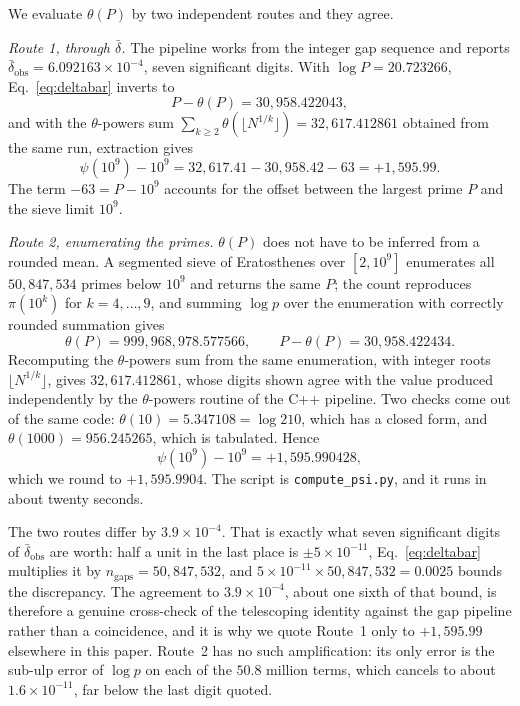 \documentclass[11pt]{article}
\begin{document}
We evaluate $\theta(P)$ by two independent routes and they agree.

\noindent\emph{Route 1, through $\bar\delta$.} The pipeline works from
the integer gap sequence and reports $\bar\delta_{\text{obs}} =
6.092163 \times 10^{-4}$, seven significant digits. With $\log P =
20.723266$, Eq.~\eqref{eq:deltabar} inverts to
\begin{equation}
P - \theta(P) = 30{,}958.422043 ,
\end{equation}
and with the $\theta$-powers sum
$\sum_{k \ge 2} \theta(\lfloor N^{1/k}\rfloor) = 32{,}617.412861$
obtained from the same run, extraction gives
\begin{equation}
\psi(10^9) - 10^9 = 32{,}617.41 - 30{,}958.42 - 63 = +1{,}595.99 .
\end{equation}
The term $-63 = P - 10^9$ accounts for the offset between the largest
prime $P$ and the sieve limit $10^9$.

\noindent\emph{Route 2, enumerating the primes.} $\theta(P)$ does not
have to be inferred from a rounded mean. A segmented sieve of
Eratosthenes over $[2, 10^9]$ enumerates all $50{,}847{,}534$ primes
below $10^9$ and returns the same $P$; the count reproduces
$\pi(10^k)$ for $k = 4,\dots,9$, and summing $\log p$ over the
enumeration with correctly rounded summation gives
\begin{equation}
\theta(P) = 999{,}968{,}978.577566, \qquad
P - \theta(P) = 30{,}958.422434 .
\label{eq:thetadirect}
\end{equation}
Recomputing the $\theta$-powers sum from the same enumeration, with
integer roots $\lfloor N^{1/k}\rfloor$, gives $32{,}617.412861$, whose
digits shown agree with the value produced independently by the
$\theta$-powers routine of the C++ pipeline. Two checks come out of the
same code: $\theta(10) = 5.347108 = \log 210$, which has a closed form,
and $\theta(1000) = 956.245265$, which is tabulated. Hence
\begin{equation}
\psi(10^9) - 10^9 = +1{,}595.990428 ,
\label{eq:psidirect}
\end{equation}
which we round to $+1{,}595.9904$. The script is
\texttt{compute\_psi.py}, and it runs in about twenty seconds.

\noindent The two routes differ by $3.9\times10^{-4}$. That is exactly
what seven significant digits of $\bar\delta_{\text{obs}}$ are worth:
half a unit in the last place is $\pm 5\times10^{-11}$, Eq.~\eqref{eq:deltabar}
multiplies it by $n_{\text{gaps}} = 50{,}847{,}532$, and
$5\times10^{-11}\times50{,}847{,}532 = 0.0025$ bounds the discrepancy.
The agreement to $3.9\times10^{-4}$, about one sixth of that bound, is
therefore a genuine cross-check of the telescoping identity against the
gap pipeline rather than a coincidence, and it is why we quote
Route~1 only to $+1{,}595.99$ elsewhere in this paper. Route~2 has no
such amplification: its only error is the sub-ulp error of $\log p$ on
each of the $50.8$ million terms, which cancels to about
$1.6\times10^{-11}$, far below the last digit quoted.
\end{document}
